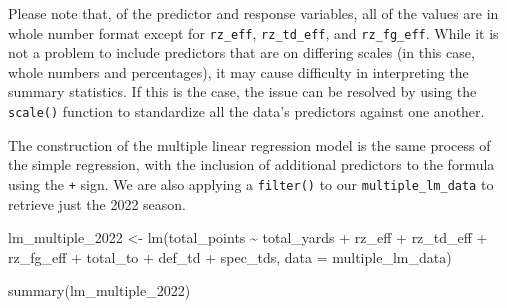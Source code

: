 \documentclass[
  letterpaper,
]{krantz}
\newenvironment{Shaded}{\begin{snugshade}}{\end{snugshade}}
\newcommand{\AttributeTok}[1]{\textcolor[rgb]{0.40,0.45,0.13}{#1}}
\newcommand{\FunctionTok}[1]{\textcolor[rgb]{0.28,0.35,0.67}{#1}}
\newcommand{\NormalTok}[1]{\textcolor[rgb]{0.00,0.23,0.31}{#1}}
\newcommand{\OtherTok}[1]{\textcolor[rgb]{0.00,0.23,0.31}{#1}}
\newcommand{\SpecialCharTok}[1]{\textcolor[rgb]{0.37,0.37,0.37}{#1}}
\begin{document}
\begin{tcolorbox}[enhanced jigsaw, colback=white, leftrule=.75mm, breakable, colframe=quarto-callout-caution-color-frame, bottomtitle=1mm, rightrule=.15mm, left=2mm, opacityback=0, bottomrule=.15mm, arc=.35mm, coltitle=black, colbacktitle=quarto-callout-caution-color!10!white, toptitle=1mm, titlerule=0mm, title=\textcolor{quarto-callout-caution-color}{\faFire}\hspace{0.5em}{Caution}, toprule=.15mm, opacitybacktitle=0.6]

Please note that, of the predictor and response variables, all of the
values are in whole number format except for \texttt{rz\_eff},
\texttt{rz\_td\_eff}, and \texttt{rz\_fg\_eff}. While it is not a
problem to include predictors that are on differing scales (in this
case, whole numbers and percentages), it may cause difficulty in
interpreting the summary statistics. If this is the case, the issue can
be resolved by using the \texttt{scale()} function to standardize all
the data's predictors against one another.

\end{tcolorbox}

The construction of the multiple linear regression model is the same
process of the simple regression, with the inclusion of additional
predictors to the formula using the \texttt{+} sign. We are also
applying a \texttt{filter()} to our \texttt{multiple\_lm\_data} to
retrieve just the 2022 season.

\begin{Shaded}
\begin{Highlighting}[]
\NormalTok{lm\_multiple\_2022 }\OtherTok{\textless{}{-}} \FunctionTok{lm}\NormalTok{(total\_points }\SpecialCharTok{\textasciitilde{}}\NormalTok{ total\_yards }\SpecialCharTok{+}\NormalTok{ rz\_eff }\SpecialCharTok{+}\NormalTok{ rz\_td\_eff }\SpecialCharTok{+}\NormalTok{ rz\_fg\_eff}
                       \SpecialCharTok{+}\NormalTok{ total\_to }\SpecialCharTok{+}\NormalTok{ def\_td }\SpecialCharTok{+}\NormalTok{ spec\_tds, }\AttributeTok{data =}\NormalTok{ multiple\_lm\_data)}

\FunctionTok{summary}\NormalTok{(lm\_multiple\_2022)}
\end{Highlighting}
\end{Shaded}
\end{document}

